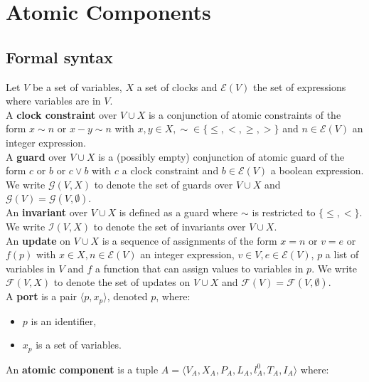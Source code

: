 \documentclass[a4paper]{article}
\begin{document}
\section*{Atomic Components}
\subsection*{Formal syntax}
Let $V$ be a set of variables, $X$ a set of clocks and $\mathcal{E}(V)$ the set of expressions where variables are in
$V$. \\
A \textbf{clock constraint} over $V \cup X$ is a conjunction of atomic constraints of the form
$x \sim n$ or $x - y \sim n$ with $x,y \in X, \sim \in \{\leq, <, \geq, >\}$ and $n \in \mathcal{E}(V)$ an integer
expression. \\
A \textbf{guard} over $V \cup X$ is a (possibly empty) conjunction of atomic guard of the form $c$ or $b$ or $c \vee b$
with $c$ a clock constraint and $b \in \mathcal{E}(V)$ a boolean expression. We write $\mathcal{G}(V, X)$ to denote the
set of guards over $V \cup X$ and
$\mathcal{G}(V) = \mathcal{G}(V, \emptyset)$. \\
An \textbf{invariant} over $V \cup X$ is defined as a guard where $\sim$ is restricted to $\{\leq, <\}$. We write
$\mathcal{I}(V, X)$ to denote the set of invariants over $V \cup X$. \\
An \textbf{update} on $V \cup X$ is a sequence of assignments of the form $x = n$ or $v = e$ or $f(p)$ with
$x \in X, n \in \mathcal{E}(V)$ an integer expression, $v \in V, e \in \mathcal{E}(V)$, $p$ a list of variables in $V$
and $f$ a function that can assign values to variables in $p$. We write $\mathcal{F}(V,X)$ to denote the set of updates
on $V \cup X$ and $\mathcal{F}(V) = \mathcal{F}(V,\emptyset)$.\\
A \textbf{port} is a pair $\langle p, x_p \rangle$, denoted $p$, where:
\begin{itemize}
  \item $p$ is an identifier,
  \item $x_p$ is a set of variables.
\end{itemize}
An \textbf{atomic component} is a tuple $A = \langle V_A, X_A, P_A, L_A, l_A^0, T_A, I_A \rangle$ where:
\end{document}
